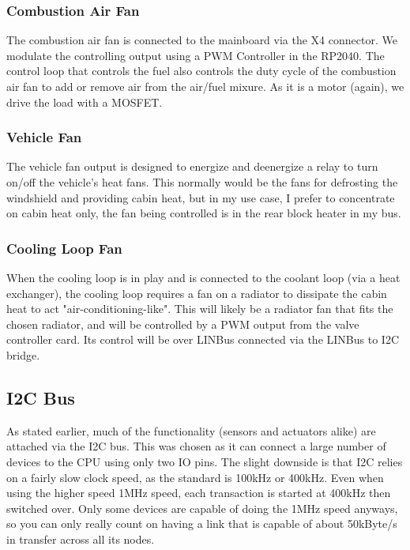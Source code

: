 \documentclass[lettersize,journal]{IEEEtran}
\begin{document}
\subsubsection{Combustion Air Fan}
The combustion air fan is connected to the mainboard via the X4 connector.  We modulate the controlling output using a PWM Controller in the RP2040.  The control loop that controls the fuel also controls the duty cycle of the combustion air fan to add or remove air from the air/fuel mixure.  As it is a motor (again), we drive the load with a MOSFET.

\subsubsection{Vehicle Fan}
The vehicle fan output is designed to energize and deenergize a relay to turn on/off the vehicle's heat fans.  This normally would be the fans for defrosting the windshield and providing cabin heat, but in my use case, I prefer to concentrate on cabin heat only, the fan being controlled is in the rear block heater in my bus.

\subsubsection{Cooling Loop Fan}
When the cooling loop is in play and is connected to the coolant loop (via a heat exchanger), the cooling loop requires a fan on a radiator to dissipate the cabin heat to act "air-conditioning-like".  This will likely be a radiator fan that fits the chosen radiator, and will be controlled by a PWM output from the valve controller card.  Its control will be over LINBus connected via the LINBus to I2C bridge.

\subsection{I2C Bus}

As stated earlier, much of the functionality (sensors and actuators alike) are attached via the I2C bus.  This was chosen as it can connect a large number of devices to the CPU using only two IO pins.  The slight downside is that I2C relies on a fairly slow clock speed, as the standard is 100kHz or 400kHz.  Even when using the higher speed 1MHz speed, each transaction is started at 400kHz then switched over.  Only some devices are capable of doing the 1MHz speed anyways, so you can only really count on having a link that is capable of about 50kByte/s in transfer across all its nodes.
\end{document}
